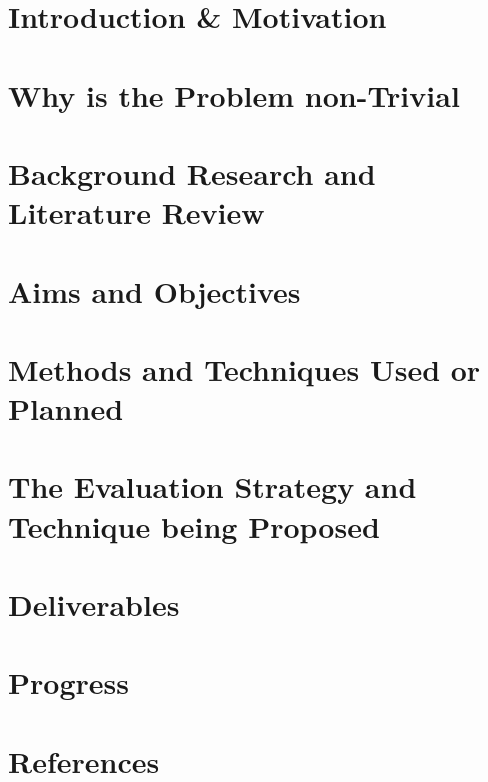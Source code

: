 \documentclass[12pt,a4paper,final]{report}
\begin{document}
	\section{Introduction \& Motivation}
	
	\section{Why is the Problem non-Trivial}
	
	\section{Background Research and Literature Review}
	
	\section{Aims and Objectives}
	
	\section{Methods and Techniques Used or Planned}
	
	\section{The Evaluation Strategy and Technique being Proposed}
	
	\section{Deliverables}
	
	\section{Progress}
	
	\section{References}
\end{document}
